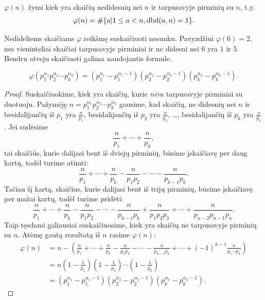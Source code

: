 \begin{api}
  $\varphi(n)$ žymi kiek yra skaičių nedidesnių nei $n$ ir tarpusavyje pirminių su
  $n$, t.y. $$\varphi(n) = \#\{a|1\le a < n, \operatorname{dbd}(a,n)=1\}.$$
\end{api}

Nedideliems skaičiams $\varphi$ reikšmę suskaičiuoti nesunku. Pavyzdžiui
$\varphi(6)=2$, nes vieninteliai skaičiai tarpusavyje pirminiai ir
ne didesni nei $6$ yra $1$ ir $5$. Bendru atveju skaičiuoti galima
naudojantis formule.

\begin{teig}
  $$\varphi(p_1^{\alpha_1}p_2^{\alpha_2}\cdots p_k^{\alpha_k})	 =
  (p_1^{\alpha_1}- p_1^{\alpha_1-1}) (p_2^{\alpha_2}- p_2^{\alpha_2-1})
  (p_k^{\alpha_k}- p_k^{\alpha_k-1}).$$ 
\end{teig}

\begin{proof}
  Suskaičiuokime, kiek yra skaičių, kurie \emph{nėra} tarpusavyje pirminiai
  su duotuoju.
  Pažymėję $n=p_1^{\alpha_1}p_2^{\alpha_2}\cdots p_k^{\alpha_k}$ gausime,
  kad skaičių, ne didesnių nei $n$ ir besidalijančių iš $p_1$ yra
  $\frac{n}{p_1}$, besidalijančių iš $p_2$ yra $\frac{n}{p_2}$, \dots,
  besidalijančių iš $p_k$ yra $\frac{n}{p_k}$. Jei sudėsime
  $$\frac{n}{p_1} + \cdots + \frac{n}{p_k},$$ tai skaiči\`{u}s, kurie dalijasi
  bent iš dviejų pirminių, būsime įskaičiavę per daug kartų, todėl turime
  atimti: $$\frac{n}{p_1} + \cdots + \frac{n}{p_k}- \frac{n}{p_1p_2} -
  \cdots - \frac{n}{p_{k-1}p_{k}}.$$ Tačiau šį kartą, skaičius, kurie
  dalijasi bent iš trijų pirminių, būsime įskaičiavę per mažai kartų, todėl
  turime pridėti:
  $$\frac{n}{p_1} + \cdots + \frac{n}{p_k}- \frac{n}{p_1p_2} - \cdots -
  \frac{n}{p_{k-1}p_{k}} + \frac{n}{p_1p_2p_3} + \cdots +
  \frac{n}{p_{n-2}p_{n-1}p_{n}}.$$ Taip tęsdami galiausiai suskaičiuosime,
  kiek yra skaičių ne tarpusavyje pirminių su $n$. Atėmę gautą rezultatą iš
  $n$ rasime $\varphi(n)$:
  \begin{align*}
    \varphi(n) & = n - (\frac{n}{p_1} + \cdots + \frac{n}{p_k}-
    \frac{n}{p_1p_2} - \cdots - \frac{n}{p_{k-1}p_{k}} + \cdots +
    (-1)^{k-1}\frac{n}{p_1\cdots p_k}) \\ 
    & = n(1-\frac{1}{p_1})(1-\frac{1}{p_2})\cdots (1-\frac{1}{p_k})\\
    & = (p_1^{\alpha_1}- p_1^{\alpha_1-1}) (p_2^{\alpha_2}-
    p_2^{\alpha_2-1}) (p_k^{\alpha_k}- p_k^{\alpha_k-1}). 
  \end{align*} 
\end{proof}

